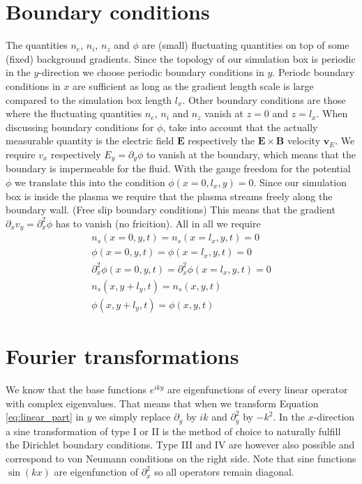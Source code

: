 \documentclass[a4paper,12pt]{scrartcl}
\renewcommand{\vec}[1]{{\mathbf{#1}}}
\begin{document}
\section{ Boundary conditions} 
The quantities $n_e$, $n_i$, $n_z$ and $\phi$ are (small) fluctuating quantities on top of
some (fixed) background gradients. Since the topology of our simulation box is periodic in the $y$-direction 
we choose periodic boundary conditions in $y$. 
Periodc boundary conditions in $x$ are sufficient as long as the gradient length scale is large 
compared to the simulation box length $l_x$.
Other boundary conditions are those where the fluctuating quantities 
$n_e$, $n_i$ and $n_z$ vanish at $z=0$ and $z=l_x$. 
When discussing boundary conditions for $\phi$, take into account that the actually measurable 
quantity is the electric field $\vec E$ respectively the $\vec E \times \vec B$ velocity $\vec v_E$.
We require $v_x $ respectively $E_y = \partial_y\phi$ to vanish at the boundary, which means that the 
boundary is impermeable for the fluid. With the gauge freedom for the potential $\phi$
we translate this into the condition $\phi( x=0,l_x, y) = 0$. Since our simulation box is
inside the plasma we require that the plasma streams freely along the boundary wall.
(Free slip boundary conditions)
This means that the gradient $\partial_x v_y = \partial_x^2 \phi$ has to vanish (no fricition). 
All in all we require
\begin{subequations}
\begin{align}
    n_s( x=0, y,t) = n_s( x=l_x, y,t) = 0 \\
    \phi( x=0, y,t) = \phi( x=l_x, y,t) = 0\\
    \partial_x^2\phi( x=0, y,t) = \partial_x^2\phi( x=l_x, y,t) = 0\\
    n_s( x, y+l_y, t) = n_s( x, y,t) \\
    \phi( x, y+l_y, t) = \phi( x, y,t)
\end{align}
\label{eq:boundary_conditions}
\end{subequations}
\section{Fourier transformations}
\label{sec:fourier}
We know that the base functions $e^{iky}$ are eigenfunctions of every linear
operator with complex eigenvalues. That means that when we transform Equation \ref{eq:linear_part} in $y$ we simply replace $\partial_y$ by $ik$ and $\partial_y^2$ by $-k^2$. 
In the $x$-direction a sine transformation of type I or II is the method of choice 
to naturally fulfill the Dirichlet boundary conditions. Type III and IV are 
however also possible and correspond to von Neumann conditions on the right side. 
Note that sine functions $\sin(k x)$ are 
eigenfunction of $\partial_x^2$ so all operators remain diagonal.
\end{document}
